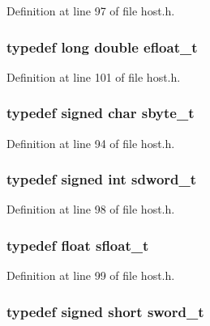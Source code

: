 Definition at line 97 of file host.h.
\subsubsection[{efloat\_\-t}]{\setlength{\rightskip}{0pt plus 5cm}typedef long double {\bf efloat\_\-t}}\label{host_8h_b7f65588dca2a9db3fd4ca155fb41ae1}




Definition at line 101 of file host.h.
\subsubsection[{sbyte\_\-t}]{\setlength{\rightskip}{0pt plus 5cm}typedef signed char {\bf sbyte\_\-t}}\label{host_8h_ea23fce331954f4c75f8651983440b33}




Definition at line 94 of file host.h.
\subsubsection[{sdword\_\-t}]{\setlength{\rightskip}{0pt plus 5cm}typedef signed int {\bf sdword\_\-t}}\label{host_8h_4ddfb9d4cf465282a95376d27686b9c7}




Definition at line 98 of file host.h.
\subsubsection[{sfloat\_\-t}]{\setlength{\rightskip}{0pt plus 5cm}typedef float {\bf sfloat\_\-t}}\label{host_8h_bdcfc9d69ad77c2f1ca15b3afe31471b}




Definition at line 99 of file host.h.
\subsubsection[{sword\_\-t}]{\setlength{\rightskip}{0pt plus 5cm}typedef signed short {\bf sword\_\-t}}\label{host_8h_f34f4258ed53975c4188dc251c368e3d}




